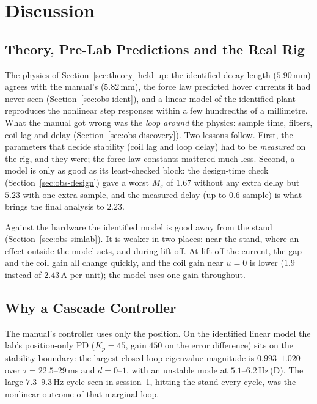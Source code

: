 \documentclass[11pt,a4paper]{article}
\newcommand{\st}[1]{\,\textup{(#1)}}
\begin{document}
\section{Discussion}
\label{sec:discussion}
\subsection{Theory, Pre-Lab Predictions and the Real Rig}
\label{sec:disc-theory}
The physics of Section~\ref{sec:theory} held up: the identified decay length ($5.90$\,mm) agrees with the manual's
($5.82$\,mm), the force law predicted hover currents it had never seen (Section~\ref{sec:obs-ident}), and a linear model of the
identified plant reproduces the nonlinear step responses within a few hundredths of a millimetre. What the manual got wrong was
the \emph{loop around} the physics: sample time, filters, coil lag and delay (Section~\ref{sec:obs-discovery}). Two lessons
follow.
First, the parameters that decide stability (coil lag and loop delay) had to be \emph{measured} on the rig, and they were; the
force-law constants mattered much less. Second, a model is only as good as its least-checked block: the design-time check
(Section~\ref{sec:obs-design}) gave a worst $M_s$ of $1.67$ without any extra delay but $5.23$ with one extra sample, and the
measured delay (up to $0.6$ sample) is what brings the final analysis to $2.23$.

Against the hardware the identified model is good away from the stand (Section~\ref{sec:obs-simlab}). It is weaker
in two places: near the stand, where an effect outside the model acts, and during lift-off. At lift-off the current, the gap and the coil gain all change
quickly, and the coil gain near $u = 0$ is lower ($1.9$ instead of $2.43$\,A per unit); the model uses one gain throughout.

\subsection{Why a Cascade Controller}
\label{sec:disc-cascade}
The manual's controller uses only the position. On the identified linear model the lab's position-only PD ($K_p = 45$, gain
$450$ on the error difference) sits on the stability boundary: the largest closed-loop eigenvalue magnitude is $0.993$--$1.020$
over $\tau = 22.5$--$29$\,ms and $d = 0$--$1$, with an unstable mode at $5.1$--$6.2$\,Hz\st{D}. The large $7.3$--$9.3$\,Hz cycle
seen in session~1, hitting the stand every cycle, was the nonlinear outcome of that marginal loop.
\end{document}
